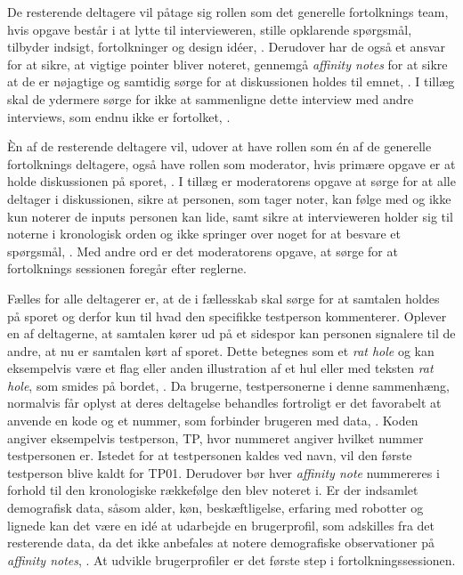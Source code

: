 De resterende deltagere vil påtage sig rollen som det generelle fortolknings team, hvis opgave består i at lytte til intervieweren, stille opklarende spørgsmål, tilbyder indsigt, fortolkninger og design idéer, \parencite[s. 108]{Book:CIInterpretationSession}. Derudover har de også et ansvar for at sikre, at vigtige pointer bliver noteret, gennemgå \textit{affinity notes} for at sikre at de er nøjagtige og samtidig sørge for at diskussionen holdes til emnet, \parencite[s. 108]{Book:CIInterpretationSession}. I tillæg skal de ydermere sørge for ikke at sammenligne dette interview med andre interviews, som endnu ikke er fortolket, \parencite[s. 108]{Book:CIInterpretationSession}. 

Èn af de resterende deltagere vil, udover at have rollen som én af de generelle fortolknings deltagere, også have rollen som moderator, hvis primære opgave er at holde diskussionen på sporet, \parencite[s. 108]{Book:CIInterpretationSession}. I tillæg er moderatorens opgave at sørge for at alle deltager i diskussionen, sikre at personen, som tager noter, kan følge med og ikke kun noterer de inputs personen kan lide, samt sikre at intervieweren holder sig til noterne i kronologisk orden og ikke springer over noget for at besvare et spørgsmål, \parencite[ss. 108-109]{Book:CIInterpretationSession}. Med andre ord er det moderatorens opgave, at sørge for at fortolknings sessionen foregår efter reglerne. 

Fælles for alle deltagerer er, at de i fællesskab skal sørge for at samtalen holdes på sporet og derfor kun til hvad den specifikke testperson kommenterer. Oplever en af deltagerne, at samtalen kører ud på et sidespor kan personen signalere til de andre, at nu er samtalen kørt af sporet. Dette betegnes som et \textit{rat hole} og kan eksempelvis være et flag eller anden illustration af et hul eller med teksten \textit{rat hole}, som smides på bordet, \parencite[s. 109]{Book:CIInterpretationSession}.\blankline
%   
Da brugerne, testpersonerne i denne sammenhæng, normalvis får oplyst at deres deltagelse behandles fortroligt er det favorabelt at anvende en kode og et nummer, som forbinder brugeren med data, \parencite[s. 111]{Book:CIInterpretationSession}. Koden angiver eksempelvis testperson, TP, hvor nummeret angiver hvilket nummer testpersonen er. Istedet for at testpersonen kaldes ved navn, vil den første testperson blive kaldt for TP01. Derudover bør hver \textit{affinity note} nummereres i forhold til den kronologiske rækkefølge den blev noteret i. Er der indsamlet demografisk data, såsom alder, køn, beskæftligelse, erfaring med robotter og lignede kan det være en idé at udarbejde en brugerprofil, som adskilles fra det resterende data, da det ikke anbefales at notere demografiske observationer på \textit{affinity notes}, \parencite[s. 109]{Book:CIInterpretationSession}. At udvikle brugerprofiler er det første step i fortolkningssessionen. 

